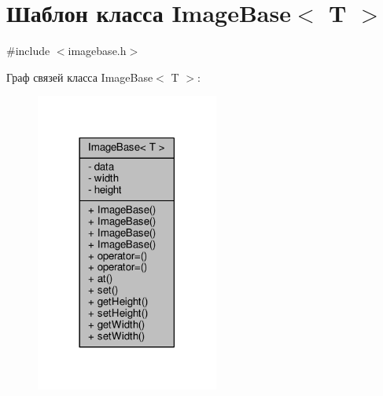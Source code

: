 \hypertarget{class_image_base}{}\section{Шаблон класса Image\+Base$<$ T $>$}
\label{class_image_base}


{\ttfamily \#include $<$imagebase.\+h$>$}



Граф связей класса Image\+Base$<$ T $>$\+:
\nopagebreak
\begin{figure}[H]
\begin{center}
\leavevmode
\includegraphics[width=170pt]{d4/d41/class_image_base__coll__graph}
\end{center}
\end{figure}
